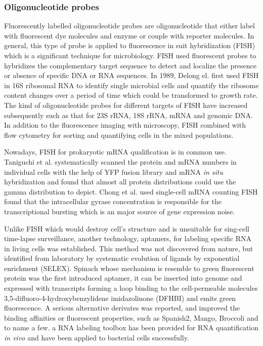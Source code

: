 \documentclass[fleqn,10pt]{wlscirep}
\begin{document}
\subsubsection[]{Oligonucleotide probes}

Fluorescently labelled oligonucleotide probes are oligonucleotide that either label with fluorescent dye molecules and enzyme or couple with reporter molecules. In general, this type of probe is applied to fluorescence in suit hybridization (FISH) which is a significant technique for microbiology\cite{Moter2000}. FISH used fluorescent probes to hybridizes the complementary target sequence to detect and localize the presence or absence of specific DNA or RNA sequences. In 1989, Delong el.\cite{DeLong1989} first used FISH in 16S ribosomal RNA to identify single microbial cells and quantify the ribosome content changes over a period of time which could be transformed to growth rate. The kind of oligonucleotide probes  for different targets of FISH have increased subsequently such as that for 23S rRNA\cite{Manz1993,Amann1995}, 18S rRNA\cite{Lischewski1996}, mRNA\cite{Wagner1998} and genomic DNA\cite{Zwirglmaier2004}. In addition to the fluorescence imaging with microscopy, FISH combined with flow cytometry for sorting and quantifying cells in the mixed populations\cite{Wallner1993}.

Nowadays, FISH for prokaryotic mRNA qualification is in common use. Taniguchi et al.\cite{Taniguchi2010} systematically scanned the protein and mRNA numbers in individual cells with the help of YFP fusion library and mRNA \emph{in situ} hybridization and found that almost all protein distributions could use the gamma distribution to depict. Chong et al.\cite{Chong2014} used single-cell mRNA counting FISH found that the intracellular gyrase concentration is responsible for the transcriptional bursting which is an major source of gene expression noise.

Unlike FISH which would destroy cell's structure and is unsuitable for sing-cell time-lapse surveillance, another technology, aptamers, for labeling specific RNA in living cells was established. This method was not discovered from nature, but identified from laboratory by systematic evolution of ligands by exponential enrichment (SELEX). Spinach\cite{Paige2011} whose mechanism is resemble to green fluorescent protein was the first introduced aptamer, it can be inserted into genome and expressed with transcripts forming a loop binding to the cell-permeable molecules 3,5-difluoro-4-hydroxybenzylidene imidazolinone (DFHBI) and emits green fluorescence. A serious alternative derivates was reported, and improved the binding affinities or fluorescent properties, such as Spanish2\cite{Strack2013}, Mango\cite{Dolgosheina2014}, Broccoli\cite{Filonov2014} and to name a few. a RNA labeling toolbox has been provided for RNA quantification \emph{in vivo} and have been applied to bacterial cells successfully\cite{Arora2015}. 
\end{document}
